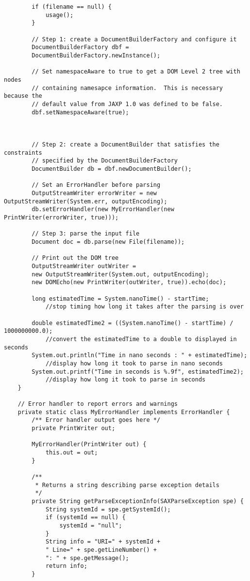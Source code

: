 \documentclass[11pt,english]{article}
\begin{document}
\begin{lstlisting}
        if (filename == null) {
            usage();
        }

        // Step 1: create a DocumentBuilderFactory and configure it
        DocumentBuilderFactory dbf =
        DocumentBuilderFactory.newInstance();

        // Set namespaceAware to true to get a DOM Level 2 tree with nodes
        // containing namesapce information.  This is necessary because the
        // default value from JAXP 1.0 was defined to be false.
        dbf.setNamespaceAware(true);

        

        // Step 2: create a DocumentBuilder that satisfies the constraints
        // specified by the DocumentBuilderFactory
        DocumentBuilder db = dbf.newDocumentBuilder();

        // Set an ErrorHandler before parsing
        OutputStreamWriter errorWriter = new OutputStreamWriter(System.err, outputEncoding);
        db.setErrorHandler(new MyErrorHandler(new PrintWriter(errorWriter, true)));

        // Step 3: parse the input file
        Document doc = db.parse(new File(filename));

        // Print out the DOM tree
        OutputStreamWriter outWriter =
        new OutputStreamWriter(System.out, outputEncoding);
        new DOMEcho(new PrintWriter(outWriter, true)).echo(doc);

        long estimatedTime = System.nanoTime() - startTime;
            //stop timing how long it takes after the parsing is over

        double estimatedTime2 = ((System.nanoTime() - startTime) / 1000000000.0);
            //convert the estimatedTime to a double to displayed in seconds
        System.out.println("Time in nano seconds : " + estimatedTime);
            //display how long it took to parse in nano seconds
        System.out.printf("Time in seconds is %.9f", estimatedTime2);
            //display how long it took to parse in seconds
    }

    // Error handler to report errors and warnings
    private static class MyErrorHandler implements ErrorHandler {
        /** Error handler output goes here */
        private PrintWriter out;

        MyErrorHandler(PrintWriter out) {
            this.out = out;
        }

        /**
         * Returns a string describing parse exception details
         */
        private String getParseExceptionInfo(SAXParseException spe) {
            String systemId = spe.getSystemId();
            if (systemId == null) {
                systemId = "null";
            }
            String info = "URI=" + systemId +
            " Line=" + spe.getLineNumber() +
            ": " + spe.getMessage();
            return info;
        }


\end{lstlisting}
\end{document}
